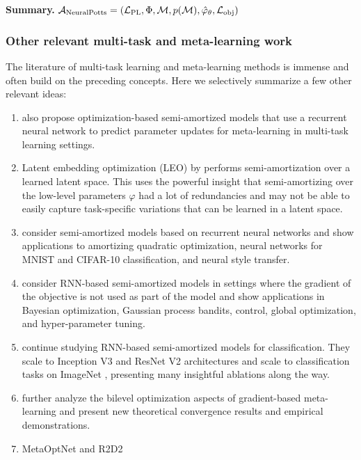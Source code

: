 \documentclass[twoside,11pt]{article}
\begin{document}
\textbf{Summary.} ${\mathcal{A}}_{\rm NeuralPotts}=({\mathcal{L}}_{\rm PL}, \Phi, {\mathcal{M}}, p({\mathcal{M}}), \hat \varphi_\theta, {\mathcal{L}}_{\rm obj})$

\subsubsection{Other relevant multi-task and meta-learning work}
The literature of multi-task learning and meta-learning
methods is immense and often build on the preceding concepts.
Here we selectively summarize a few other relevant ideas:

\begin{enumerate}
\item \citet{ravi2016optimization} also propose optimization-based
  semi-amortized models that use a recurrent neural network
  to predict parameter updates for meta-learning in multi-task
  learning settings.
\item Latent embedding optimization (LEO) by \citet{rusu2018meta}
  performs semi-amortization over a learned latent space.
  This uses the powerful insight that semi-amortizing over
  the low-level parameters $\varphi$ had a lot of redundancies
  and may not be able to easily capture task-specific
  variations that can be learned in a latent space.
\item \citet{andrychowicz2016learning}
  consider semi-amortized models based on recurrent neural networks
  and show applications to amortizing quadratic optimization,
  neural networks for MNIST and CIFAR-10 classification,
  and neural style transfer.
\item \citet{chen2017learning} consider RNN-based semi-amortized models
  in settings where the gradient of the objective is not
  used as part of the model and show applications in Bayesian
  optimization, Gaussian process bandits, control, global optimization,
  and hyper-parameter tuning.
\item \citet{wichrowska2017learned} continue studying
  RNN-based semi-amortized models for classification.
  They scale to Inception V3 \citep{szegedy2016rethinking}
  and ResNet V2 \citep{he2016identity} architectures
  and scale to classification tasks on ImageNet
  \citep{russakovsky2015imagenet}, presenting many
  insightful ablations along the way.
\item \citet{franceschi2018bilevel} further analyze the
  bilevel optimization aspects of gradient-based meta-learning
  and present new theoretical convergence results and
  empirical demonstrations.
\item MetaOptNet \citep{lee2019meta} and R2D2 \citep{bertinetto2018meta}

\end{enumerate}
\end{document}
